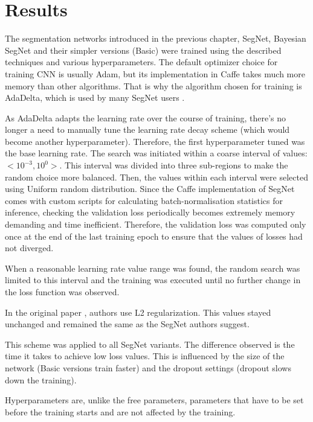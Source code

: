 \chapter{Results}

The segmentation networks introduced in the previous chapter, SegNet, Bayesian SegNet and their simpler versions (Basic) were trained using the described techniques and various hyperparameters. The default optimizer choice for training CNN is usually Adam, but its implementation in Caffe takes much more memory than other algorithms. That is why the algorithm chosen for training is AdaDelta, which is used by many SegNet users \cite{aizawan_github}.

As AdaDelta adapts the learning rate over the course of training, there's no longer a need to manually tune the learning rate decay scheme (which would become another hyperparameter). Therefore, the first hyperparameter tuned was the base learning rate. The search was initiated within a coarse interval of values: $ <10^{-3}, 10^{0}>  $. This interval was divided into three sub-regions to make the random choice more balanced. Then, the values within each interval were selected using Uniform random distribution. Since the Caffe implementation of SegNet comes with custom scripts for calculating batch-normalisation statistics for inference, checking the validation loss periodically becomes extremely memory demanding and time inefficient. Therefore, the validation loss was computed only once at the end of the last training epoch to ensure that the values of losses had not diverged.  

When a reasonable learning rate value range was found, the random search was limited to this interval and the training was executed until no further change in the loss function was observed. 

In the original paper \cite{segnet}, authors use L2 regularization. This values stayed unchanged and remained the same as the SegNet authors suggest.  

This scheme was applied to all SegNet variants. The difference observed is the time it takes to achieve low loss values. This is influenced by the size of the network (Basic versions train faster) and the dropout settings (dropout slows down the training). 


Hyperparameters are, unlike the free parameters, parameters that have to be set before the training
starts and are not affected by the training.

